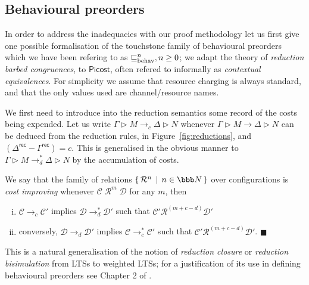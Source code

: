 \documentclass{LMCS}
\newcommand{\pfn}[1]{\mathsf{#1}}  \newcommand{\cfn}[1]{\mathsf{#1}}  \newcommand{\ownfnt}[1]{{\mathsf{#1}}}
\newcommand{\picost}{\ensuremath{\pfn{Picost}}\xspace}
\newcommand{\with}{\mathbin \rhd}
\newcommand{\record}{{\scriptstyle \mathsf{rec}}}
\newcommand{\nats}{\ensuremath{\bbb N}\xspace}
\newcommand{\behav}[1]{\mathrel{\sqsubseteq_{\rm behav}^{#1}}}
\newcommand{\setof}[2]{\{ \, #1 \, \mid \, #2 \, \}}\newcommand{\sset}[1]{\{ {#1}  \}  }
\newcommand{\calR}{\mathbin{\mathcal{R}}}
\newcommand{\calC}{\mathcal{C}}
\newcommand{\calD}{\mathcal{D}}
\newcommand{\smalleval}{\longrightarrow}  \newcommand{\csmalleval}[1]{\longrightarrow^{#1}}
\newcommand{\EndDefBox}{\null\hfill$\blacksquare$}
\newcommand{\boxHere}{\global\let\EndProof\empty\EndDefBox}
\begin{document}
\subsection{Behavioural preorders}

In order to address the inadequacies with our proof methodology let us
first give one possible formalisation of the touchstone family of
behavioural preorders which we have been refering to as 
$\behav{n}, n \geq 0$; we adapt the theory of
\emph{reduction barbed congruences}, \cite{ht92,pibook,pityping} to
\picost, often refered to informally as \emph{contextual equivalences}. 
For simplicity we assume that resource charging is always
standard, and that the only values used are channel/resource names.

We first need to introduce into the reduction semantics some record of the
costs being expended. Let us write 
\begin{math}
  \Gamma \with M \smalleval_c  \Delta \with N
\end{math}
whenever 
\begin{math}
   \Gamma \with M \smalleval  \Delta \with N
\end{math}
can be deduced from the reduction rules, in Figure~\ref{fig:reductions}, and 
$(\Delta^\record - \Gamma^\record)  = c$. This is generalised in the obvious manner
to 
\begin{math}
    \Gamma \with M \smalleval^*_d  \Delta \with N
\end{math}
by the accumulation of costs. 

\begin{defi}
 We say that the family 
of relations
$\setof{\calR^n}{ n \in \nats} $ over configurations
is \emph{cost improving} whenever 
$\calC \;\calR^m\; \calD$ for any $m$, then
\begin{enumerate}[(i)]
\item $\calC \smalleval_c \calC'$ implies $\calD \smalleval^*_d \calD'$ such that 
      $\calC' \calR^{(m+c-d)} \calD'$

\item conversely,  $\calD \smalleval_d \calD'$ implies $\calC \smalleval^*_c \calC'$ such that 
      $\calC' \calR^{(m+c-d)} \calD'$.
\boxHere
\end{enumerate}
\end{defi}
\noindent
This is a natural generalisation of the notion of \emph{reduction closure}
or \emph{reduction bisimulation} from LTSs to weighted LTSs; for a justification
of its use in defining behavioural preorders see Chapter 2 of \cite{pibook}.
\end{document}
